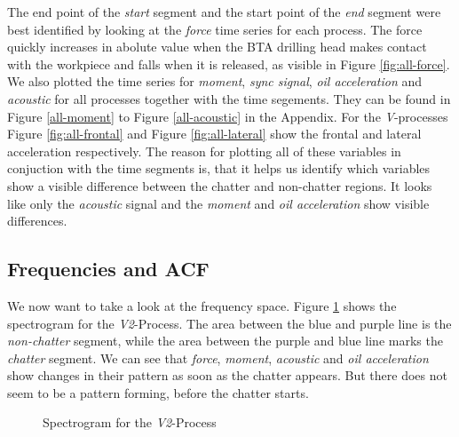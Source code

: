 \documentclass[12 pt]{scrartcl}
\begin{document}
The end point of the \emph{start} segment and the start point of the \emph{end} segment were best identified by looking at the \emph{force} time series for each process. The force quickly increases in abolute value when the BTA drilling head makes contact with the workpiece and falls when it is released, as visible in Figure \ref{fig:all-force}.
We also plotted the time series for \emph{moment}, \emph{sync signal}, \emph{oil acceleration} and \emph{acoustic} for all processes together with the time segements. They can be found in Figure \ref{all-moment} to Figure \ref{all-acoustic} in the Appendix. For the \emph{V}-processes Figure \ref{fig:all-frontal} and Figure \ref{fig:all-lateral} show the frontal and lateral acceleration respectively. The reason for plotting all of these variables in conjuction with the time segments is, that it helps us identify which variables show a visible difference between the chatter and non-chatter regions. It looks like only the \emph{acoustic} signal and the \emph{moment} and \emph{oil acceleration} show visible differences.

\subsection{Frequencies and ACF}

We now want to take a look at the frequency space. Figure \ref{fig:v2-spec} shows the spectrogram for the \emph{V2}-Process.
The area between the blue and purple line is the \emph{non-chatter} segment, while the area between the purple and blue line marks the \emph{chatter} segment. We can see that \emph{force}, \emph{moment}, \emph{acoustic} and \emph{oil acceleration} show changes in their pattern as soon as the chatter appears. But there does not seem to be a pattern forming, before the chatter starts.

\begin{figure}[p]
  \caption{Spectrogram for the \emph{V2}-Process}
  \label{fig:v2-spec}
\end{figure}
\end{document}
